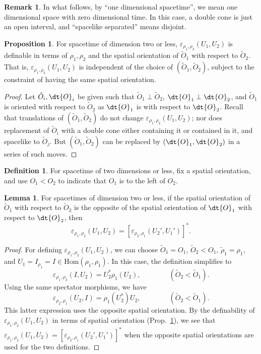 \documentclass[12pt]{article}
\theoremstyle{definition}
\newtheorem{prop}[thm]{Proposition}
\newtheorem{lemma}[thm]{Lemma}
\theoremstyle{definition}
\newtheorem{defn}[thm]{Definition}
\newtheorem{note}[thm]{Remark}
\theoremstyle{remark}
\newcommand{\ve}{\varepsilon}
\def\wt#1{{\tilde #1}}
\newcommand{\Hom}{\mathrm{Hom}}
\begin{document}
\begin{note} In what follows, by ``one dimensional
  spacetime'', we mean one dimensional space with zero
  dimensional time.  In this case, a double cone is
  just an open interval, and ``spacelike separated''
  means disjoint. \end{note}

\begin{prop} For spacetime of dimension two or less,
  $\ve _{\rho _1,\rho _2}(U_1,U_2)$ is definable in
  terms of $\rho _1,\rho _2$ and the spatial
  orientation of $\wt O_1$ with respect to $\wt O_2$.
  That is, $\ve _{\rho _1,\rho _2}(U_1,U_2)$ is
  independent of the choice of $(\wt O_1,\wt O_2)$,
  subject to the constraint of having the same spatial
  orientation.  \label{orient} \end{prop}

\begin{proof} Let $\wt O_i,\dt{O}_i$ be given such that $\wt O_1\perp \wt O_2$,
  $\dt{O}_1\perp \dt{O}_2$, and $\wt O_1$ is oriented with respect to $\wt O_2$ as
  $\dt{O}_1$ is with respect to $\dt{O}_2$.  Recall that translations of $(\wt
  O_1,\wt O_2)$ do not change $\ve _{\rho _1,\rho _2}(U_1,U_2)$; nor does replacement
  of $\wt O_i$ with a double cone either containing it or contained in it, and
  spacelike to $\wt O_j$.  But $(\wt O_1,\wt O_2)$ can be replaced by
  $(\dt{O}_1,\dt{O}_2)$ in a series of such moves.
\end{proof}

\begin{defn} For spacetime of two dimensions or less, fix a spatial orientation, and
  use $O_1<O_2$ to indicate that $O_1$ is to the left of $O_2$.  \end{defn} 

\begin{lemma} For spacetimes of dimension two or less, if the spatial orientation of
  $\wt O_1$ with respect to $\wt O_2$ is the opposite of the spatial orientation of
  $\dt{O}_1$ with respect to $\dt{O}_2$, then
$$ \ve _{\rho _1,\rho _2}(U_1,U_2) =[\ve _{\rho _2,\rho _1}(U_2',U_1')]^* .$$
\end{lemma}

\begin{proof} For defining $\ve _{\rho _1,\rho _2}(U_1,U_2)$, we can choose $\wt
  O_1=O_1$, $\wt O_2<O_1$, $\wt \rho _1=\rho _1$, and $U_1=I_{\rho _1}=I\in \Hom
  (\rho _1,\rho _1)$.  In this case, the definition simplifies to
$$ \ve _{\rho _1,\rho _2}(I,U_2) = U_2^*\rho _1(U_2),\qquad
\qquad (\wt O_2<\wt O_1) .$$ Using the same spectator morphisms, we have
$$ \ve _{\rho _2,\rho _1}(U_2,I) = \rho _1(U_2^*)U_2 ,\qquad \qquad (\wt O_2<\wt
O_1). $$ This latter expression uses the opposite spatial orientation.  By the
definability of $\ve _{\rho _1,\rho _2}(U_1,U_2)$ in terms of spatial orientation
(Prop.\ \ref{orient}), we see that $\ve _{\rho _1,\rho _2}(U_1,U_2)=[\ve _{\rho
  _2,\rho _1}(U_2',U_1')]^*$ when the opposite spatial orientations are used for the
two definitions.  \end{proof}
\end{document}
